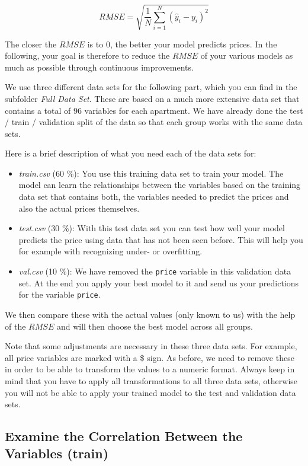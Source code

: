 \documentclass[
  11pt,
]{article}
\begin{document}
\[ RMSE = \sqrt{\frac{1}{N}\sum_{i=1}^{N}{(\hat{y}_i-y_i)^2}} \]

The closer the \(RMSE\) is to 0, the better your model predicts prices. In the following, your goal is therefore to reduce the \(RMSE\) of your various models as much as possible through continuous improvements.

We use three different data sets for the following part, which you can find in the subfolder \emph{Full Data Set}. These are based on a much more extensive data set that contains a total of 96 variables for each apartment. We have already done the test / train / validation split of the data so that each group works with the same data sets.

Here is a brief description of what you need each of the data sets for:

\begin{itemize}
\item
  \emph{train.csv} (60 \%): You use this training data set to train your model. The model can learn the relationships between the variables based on the training data set that contains both, the variables needed to predict the prices and also the actual prices themselves.
\item
  \emph{test.csv} (30 \%): With this test data set you can test how well your model predicts the price using data that has not been seen before. This will help you for example with recognizing under- or overfitting.
\item
  \emph{val.csv} (10 \%): We have removed the \texttt{price} variable in this validation data set. At the end you apply your best model to it and send us your predictions for the variable \texttt{price}.
\end{itemize}

We then compare these with the actual values (only known to us) with the help of the \(RMSE\) and will then choose the best model across all groups.

Note that some adjustments are necessary in these three data sets. For example, all price variables are marked with a \$ sign. As before, we need to remove these in order to be able to transform the values to a numeric format. Always keep in mind that you have to apply all transformations to all three data sets, otherwise you will not be able to apply your trained model to the test and validation data sets.

\hypertarget{examine-the-correlation-between-the-variables-train}{%
\subsection{Examine the Correlation Between the Variables (train)}\label{examine-the-correlation-between-the-variables-train}}
\end{document}
